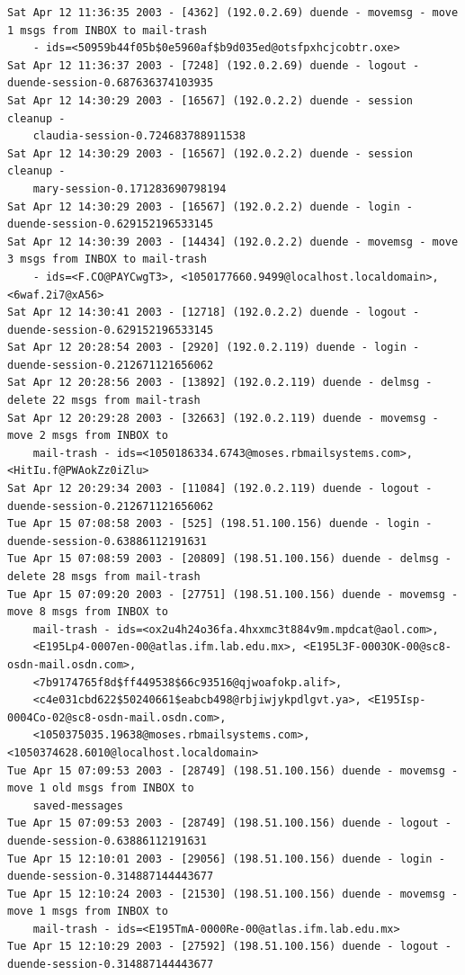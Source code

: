 \begin{lstlisting}[style=terminal]
Sat Apr 12 11:36:35 2003 - [4362] (192.0.2.69) duende - movemsg - move 1 msgs from INBOX to mail-trash 
    - ids=<50959b44f05b$0e5960af$b9d035ed@otsfpxhcjcobtr.oxe>
Sat Apr 12 11:36:37 2003 - [7248] (192.0.2.69) duende - logout - duende-session-0.687636374103935
Sat Apr 12 14:30:29 2003 - [16567] (192.0.2.2) duende - session cleanup - 
    claudia-session-0.724683788911538
Sat Apr 12 14:30:29 2003 - [16567] (192.0.2.2) duende - session cleanup - 
    mary-session-0.171283690798194
Sat Apr 12 14:30:29 2003 - [16567] (192.0.2.2) duende - login - duende-session-0.629152196533145
Sat Apr 12 14:30:39 2003 - [14434] (192.0.2.2) duende - movemsg - move 3 msgs from INBOX to mail-trash 
    - ids=<F.CO@PAYCwgT3>, <1050177660.9499@localhost.localdomain>, <6waf.2i7@xA56>
Sat Apr 12 14:30:41 2003 - [12718] (192.0.2.2) duende - logout - duende-session-0.629152196533145
Sat Apr 12 20:28:54 2003 - [2920] (192.0.2.119) duende - login - duende-session-0.212671121656062
Sat Apr 12 20:28:56 2003 - [13892] (192.0.2.119) duende - delmsg - delete 22 msgs from mail-trash
Sat Apr 12 20:29:28 2003 - [32663] (192.0.2.119) duende - movemsg - move 2 msgs from INBOX to 
    mail-trash - ids=<1050186334.6743@moses.rbmailsystems.com>, <HitIu.f@PWAokZz0iZlu>
Sat Apr 12 20:29:34 2003 - [11084] (192.0.2.119) duende - logout - duende-session-0.212671121656062
Tue Apr 15 07:08:58 2003 - [525] (198.51.100.156) duende - login - duende-session-0.63886112191631
Tue Apr 15 07:08:59 2003 - [20809] (198.51.100.156) duende - delmsg - delete 28 msgs from mail-trash
Tue Apr 15 07:09:20 2003 - [27751] (198.51.100.156) duende - movemsg - move 8 msgs from INBOX to 
    mail-trash - ids=<ox2u4h24o36fa.4hxxmc3t884v9m.mpdcat@aol.com>, 
    <E195Lp4-0007en-00@atlas.ifm.lab.edu.mx>, <E195L3F-0003OK-00@sc8-osdn-mail.osdn.com>, 
    <7b9174765f8d$ff449538$66c93516@qjwoafokp.alif>, 
    <c4e031cbd622$50240661$eabcb498@rbjiwjykpdlgvt.ya>, <E195Isp-0004Co-02@sc8-osdn-mail.osdn.com>, 
    <1050375035.19638@moses.rbmailsystems.com>, <1050374628.6010@localhost.localdomain>
Tue Apr 15 07:09:53 2003 - [28749] (198.51.100.156) duende - movemsg - move 1 old msgs from INBOX to 
    saved-messages
Tue Apr 15 07:09:53 2003 - [28749] (198.51.100.156) duende - logout - duende-session-0.63886112191631
Tue Apr 15 12:10:01 2003 - [29056] (198.51.100.156) duende - login - duende-session-0.314887144443677
Tue Apr 15 12:10:24 2003 - [21530] (198.51.100.156) duende - movemsg - move 1 msgs from INBOX to 
    mail-trash - ids=<E195TmA-0000Re-00@atlas.ifm.lab.edu.mx>
Tue Apr 15 12:10:29 2003 - [27592] (198.51.100.156) duende - logout - duende-session-0.314887144443677

\end{lstlisting}
